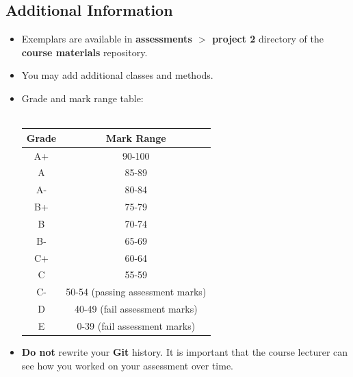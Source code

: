 \documentclass{article}
\begin{document}
\subsection*{Additional Information}
\begin{itemize}
    \item Exemplars are available in \textbf{assessments $>$ project 2} directory of the \textbf{course materials} repository.
    \item You may add additional classes and methods. 
    \item Grade and mark range table:\\\\
    \renewcommand{\arraystretch}{1.5}
    \begin{tabular}{|c|c|}
        \hline
        \textbf{Grade} & \textbf{Mark Range} \\ \hline
        A+ & 90-100  \\ \hline
        A & 85-89  \\ \hline
        A- & 80-84 \\ \hline
        B+ & 75-79   \\ \hline
        B & 70-74  \\ \hline
        B- & 65-69  \\ \hline
        C+ & 60-64  \\ \hline
        C & 55-59 \\ \hline
        C- & 50-54 (passing assessment marks)  \\ \hline
        D & 40-49 (fail assessment marks)   \\ \hline
        E & 0-39 (fail assessment marks)   \\ \hline
    \end{tabular}
    \item \textbf{Do not} rewrite your \textbf{Git} history. It is important that the course lecturer can see how you worked on your assessment over time.
\end{itemize}
\end{document}
